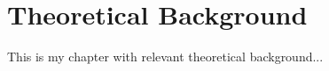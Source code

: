 \chapter{Theoretical Background}
\label{Theoretical Background}

This is my chapter with relevant theoretical background...